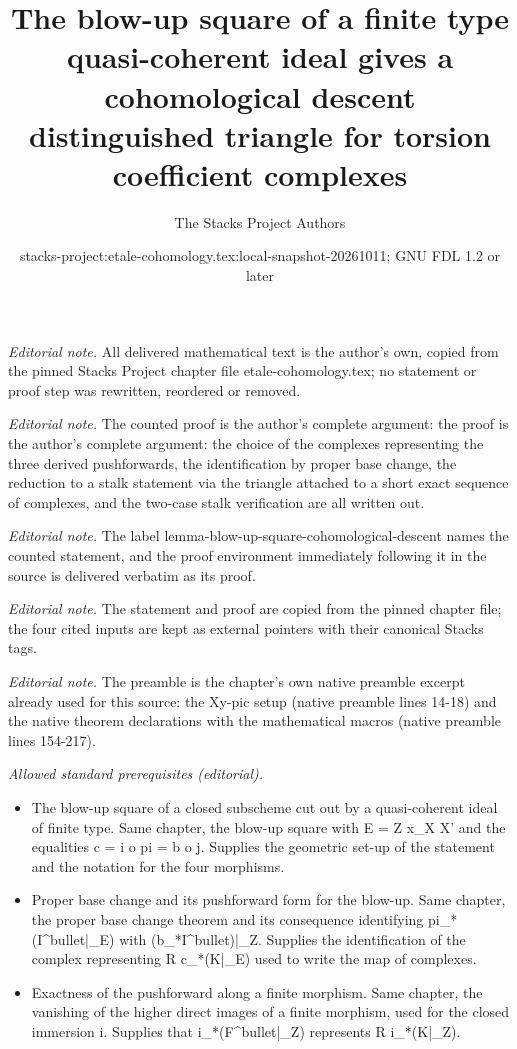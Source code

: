 \documentclass[10pt,a4paper]{amsart}
\title{The blow-up square of a finite type quasi-coherent ideal gives a cohomological descent distinguished triangle for torsion coefficient complexes}
\author{The Stacks Project Authors}
\date{stacks-project:etale-cohomology.tex:local-snapshot-20261011; GNU FDL 1.2 or later}
\theoremstyle{plain}
\theoremstyle{definition}
\theoremstyle{remark}
\numberwithin{equation}{subsection}
\begin{document}
\maketitle
\noindent\textit{Editorial note.} All delivered mathematical text is the author's own, copied from the pinned Stacks Project chapter file etale-cohomology.tex; no statement or proof step was rewritten, reordered or removed.\par\medskip
\noindent\textit{Editorial note.} The counted proof is the author's complete argument: the proof is the author's complete argument: the choice of the complexes representing the three derived pushforwards, the identification by proper base change, the reduction to a stalk statement via the triangle attached to a short exact sequence of complexes, and the two-case stalk verification are all written out.\par\medskip
\noindent\textit{Editorial note.} The label lemma-blow-up-square-cohomological-descent names the counted statement, and the proof environment immediately following it in the source is delivered verbatim as its proof.\par\medskip
\noindent\textit{Editorial note.} The statement and proof are copied from the pinned chapter file; the four cited inputs are kept as external pointers with their canonical Stacks tags.\par\medskip
\noindent\textit{Editorial note.} The preamble is the chapter's own native preamble excerpt already used for this source: the Xy-pic setup (native preamble lines 14-18) and the native theorem declarations with the mathematical macros (native preamble lines 154-217).\par\medskip
\noindent\textit{Allowed standard prerequisites (editorial).}\begin{itemize}
\item The blow-up square of a closed subscheme cut out by a quasi-coherent ideal of finite type. Same chapter, the blow-up square with E = Z x\_X X' and the equalities c = i o pi = b o j. Supplies the geometric set-up of the statement and the notation for the four morphisms.
\item Proper base change and its pushforward form for the blow-up. Same chapter, the proper base change theorem and its consequence identifying pi\_*(I\textasciicircum{}bullet|\_E) with (b\_*I\textasciicircum{}bullet)|\_Z. Supplies the identification of the complex representing R c\_*(K|\_E) used to write the map of complexes.
\item Exactness of the pushforward along a finite morphism. Same chapter, the vanishing of the higher direct images of a finite morphism, used for the closed immersion i. Supplies that i\_*(F\textasciicircum{}bullet|\_Z) represents R i\_*(K|\_Z).
\end{itemize}\medskip
\end{document}
